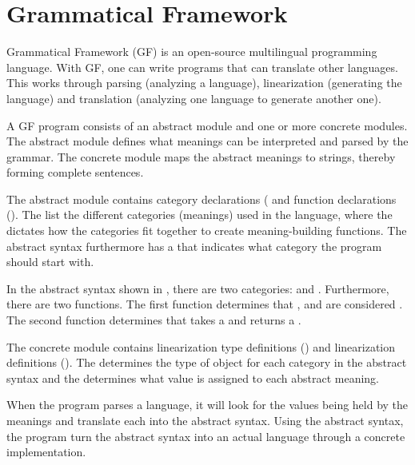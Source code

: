 \section{Grammatical Framework}
\label{04_GF}

Grammatical Framework (GF) is an open-source multilingual programming language. With GF, one can write programs that can translate other languages. This works through parsing (analyzing a language), linearization (generating the language) and translation (analyzing one language to generate another one).

A GF program consists of an abstract module and one or more concrete modules. The abstract module defines what meanings can be interpreted and parsed by the grammar. The concrete module maps the abstract meanings to strings, thereby forming complete sentences.

The abstract module contains category declarations ( and function declarations (). The  list the different categories (meanings) used in the language, where the  dictates how the categories fit together to create meaning-building functions. The abstract syntax furthermore has a  that indicates what category the program should start with. 


In the abstract syntax shown in , there are two categories:  and . Furthermore, there are two functions. The first function determines that ,  and  are considered . The second function determines that  takes a  and returns a .

The concrete module contains linearization type definitions () and linearization definitions
(). The  determines the type of object for each category in the abstract syntax and the  determines what value is assigned to each abstract meaning. 

When the program parses a language, it will look for the values being held by the meanings and translate each into the abstract syntax. Using the abstract syntax, the program turn the abstract syntax into an actual language through a concrete implementation.


